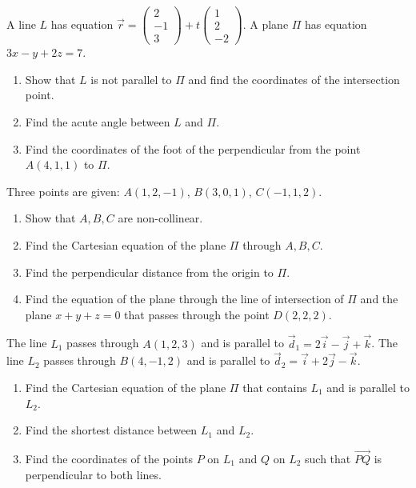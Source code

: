 \documentclass[11pt]{article}
\begin{document}
\begin{exercice}
A line $L$ has equation $\vec{r}=\begin{pmatrix}2\\-1\\3\end{pmatrix}+t\begin{pmatrix}1\\2\\-2\end{pmatrix}$. A plane $\Pi$ has equation $3x-y+2z=7$.
\begin{enumerate}
\item Show that $L$ is not parallel to $\Pi$ and find the coordinates of the intersection point.
\item Find the acute angle between $L$ and $\Pi$.
\item Find the coordinates of the foot of the perpendicular from the point $A(4,1,1)$ to $\Pi$.
\end{enumerate}
\end{exercice}

\begin{exercice}
Three points are given: $A(1,2,-1)$, $B(3,0,1)$, $C(-1,1,2)$.
\begin{enumerate}
\item Show that $A,B,C$ are non-collinear.
\item Find the Cartesian equation of the plane $\Pi$ through $A,B,C$.
\item Find the perpendicular distance from the origin to $\Pi$.
\item Find the equation of the plane through the line of intersection of $\Pi$ and the plane $x+y+z=0$ that passes through the point $D(2,2,2)$.
\end{enumerate}
\end{exercice}

\begin{exercice}
The line $L_1$ passes through $A(1,2,3)$ and is parallel to $\vec{d}_1=2\vec{i}-\vec{j}+\vec{k}$.
The line $L_2$ passes through $B(4,-1,2)$ and is parallel to $\vec{d}_2=\vec{i}+2\vec{j}-\vec{k}$.
\begin{enumerate}
\item Find the Cartesian equation of the plane $\Pi$ that contains $L_1$ and is parallel to $L_2$.
\item Find the shortest distance between $L_1$ and $L_2$.
\item Find the coordinates of the points $P$ on $L_1$ and $Q$ on $L_2$ such that $\overrightarrow{PQ}$ is perpendicular to both lines.
\end{enumerate}
\end{exercice}
\end{document}
